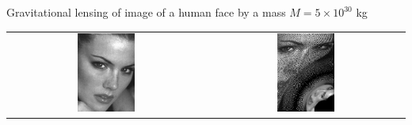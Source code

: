 \documentclass[aspectratio=1610,xcolor=dvipsnames,t]{beamer}
\begin{document}
\begin{frame}{Gravitational lensing of image of a human face by a mass $M = 5 \times 10^{30}$ kg} 
    \begin{center}
    \begin{tabular}{cc}
        \includegraphics[width=0.3\textwidth]{pics/kr.eps} &
        \includegraphics[width=0.3\textwidth]{pics/kr_5e30.eps} \\
    \end{tabular}
    \end{center}
\end{frame} 


\end{document}
